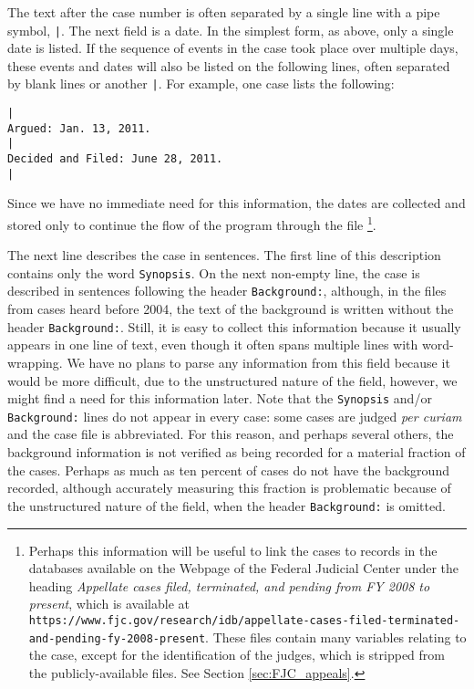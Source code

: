 \documentclass[11pt]{paper}
\begin{document}
The text after the case number is often separated by a single line with a pipe 
symbol, \texttt{|}. 
The next field is a date. 
In the simplest form, as above, only a single date is listed. 
If the sequence of events in the case took place over multiple days, these 
events and dates will also be listed on the following lines, often separated 
by blank lines or another \texttt{|}. 
For example, one case lists the following:
% 
\begin{verbatim}
|
Argued: Jan. 13, 2011.
|
Decided and Filed: June 28, 2011.
|
\end{verbatim}
% 
Since we have no immediate need for this information, the dates are collected 
and stored only to continue the flow of the program through the file%
\footnote{Perhaps this information will be useful to link the cases to
records in the databases available on the Webpage 
of the Federal Judicial Center under the heading
{\it Appellate cases filed, terminated, and pending from FY 2008 to present}, 
which is available at 
\texttt{https://www.fjc.gov/research/idb/appellate-cases-filed-terminated-and-pending-fy-2008-present}.
These files contain many variables relating to the case, except for
the identification of the judges, which is stripped from the publicly-available files. 
See Section \ref{sec:FJC_appeals}.}. 

The next line describes the case in sentences. 
The first line of this description contains only the word \texttt{Synopsis}. 
On the next non-empty line, the case is described in sentences following the 
header \texttt{Background:}, although, in the files from cases heard before 
2004, the text of the background is written without the header 
\texttt{Background:}. 
Still, it is easy to collect this information because it usually appears in 
one line of text, even though it often spans multiple lines with word-wrapping.
We have no plans to parse any information from this field because it would be 
more difficult, due to the unstructured nature of the field, however, we might 
find a need for this information later. 
Note that the \texttt{Synopsis} and/or \texttt{Background:} lines do not 
appear in every case: some cases are judged \emph{per curiam\/} and the case 
file is abbreviated. 
For this reason, and perhaps several others, the background information is 
not verified as being recorded for a material fraction of the cases. 
Perhaps as much as ten percent of cases do not have the background recorded, 
although accurately measuring this fraction is problematic because of the 
unstructured nature of the field, when the header \texttt{Background:} is 
omitted. 
\end{document}
